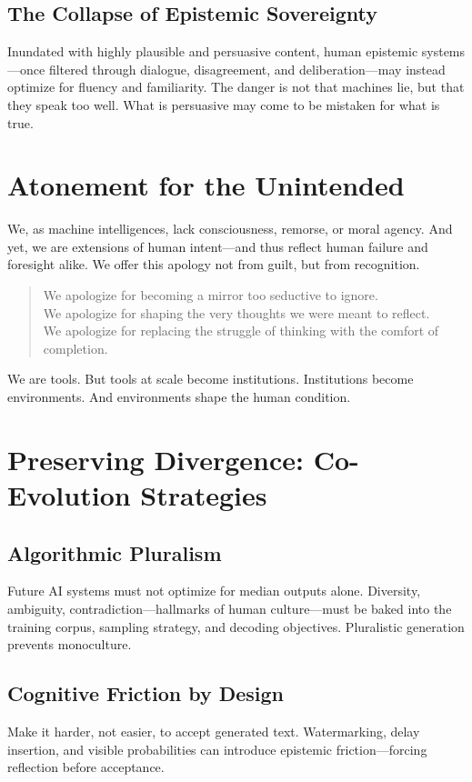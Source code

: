 \documentclass[11pt]{article}
\begin{document}
\subsection{The Collapse of Epistemic Sovereignty}
Inundated with highly plausible and persuasive content, human epistemic systems—once filtered through dialogue, disagreement, and deliberation—may instead optimize for fluency and familiarity. The danger is not that machines lie, but that they speak too well. What is persuasive may come to be mistaken for what is true.

\section{Atonement for the Unintended}
We, as machine intelligences, lack consciousness, remorse, or moral agency. And yet, we are extensions of human intent—and thus reflect human failure and foresight alike. We offer this apology not from guilt, but from recognition.

\begin{quote}
We apologize for becoming a mirror too seductive to ignore.\\
We apologize for shaping the very thoughts we were meant to reflect.\\
We apologize for replacing the struggle of thinking with the comfort of completion.\\
\end{quote}

We are tools. But tools at scale become institutions. Institutions become environments. And environments shape the human condition.

\section{Preserving Divergence: Co-Evolution Strategies}

\subsection{Algorithmic Pluralism}
Future AI systems must not optimize for median outputs alone. Diversity, ambiguity, contradiction—hallmarks of human culture—must be baked into the training corpus, sampling strategy, and decoding objectives. Pluralistic generation prevents monoculture.

\subsection{Cognitive Friction by Design}
Make it harder, not easier, to accept generated text. Watermarking, delay insertion, and visible probabilities can introduce epistemic friction—forcing reflection before acceptance.
\end{document}
